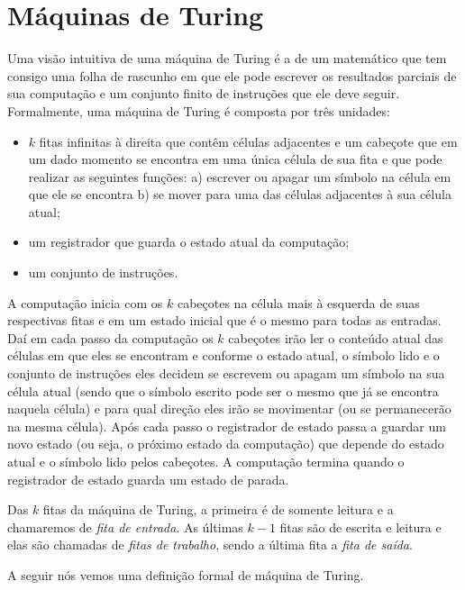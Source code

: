 \section{Máquinas de Turing} \label{section_turing_machines}


Uma visão intuitiva de uma máquina de Turing é a de um matemático que tem consigo uma folha de rascunho em que ele pode escrever os resultados parciais de sua computação e um conjunto finito de instruções que ele deve seguir. Formalmente, uma máquina de Turing é composta por três unidades:

\begin{itemize}

\item $k$ fitas infinitas à direita que contêm células adjacentes e um cabeçote que em um dado momento se encontra em uma única célula de sua fita e que pode realizar as seguintes funções: a) escrever ou apagar um símbolo na célula em que ele se encontra b) se mover para uma das células adjacentes à sua célula atual;

\item um registrador que guarda o estado atual da computação;

\item um conjunto de instruções.

\end{itemize}

A computação inicia com os $k$ cabeçotes na célula mais à esquerda de suas respectivas fitas e em um estado inicial que é o mesmo para todas as entradas. Daí em cada passo da computação os $k$ cabeçotes irão ler o conteúdo atual das células em que eles se encontram e conforme o estado atual, o símbolo lido e o conjunto de instruções eles decidem se escrevem ou apagam um símbolo na sua célula atual (sendo que o símbolo escrito pode ser o mesmo que já se encontra naquela célula) e para qual direção eles irão se movimentar (ou se permanecerão na mesma célula). Após cada passo o registrador de estado passa a guardar um novo estado (ou seja, o próximo estado da computação) que depende do estado atual e o símbolo lido pelos cabeçotes. A computação termina quando o registrador de estado guarda um estado de parada.

Das $k$ fitas da máquina de Turing, a primeira é de somente leitura e a chamaremos de \emph{fita de entrada}. As últimas $k - 1$ fitas são de escrita e leitura e elas são chamadas de \emph{fitas de trabalho}, sendo a última fita a \emph{fita de saída}.

A seguir nós vemos uma definição formal de máquina de Turing.

